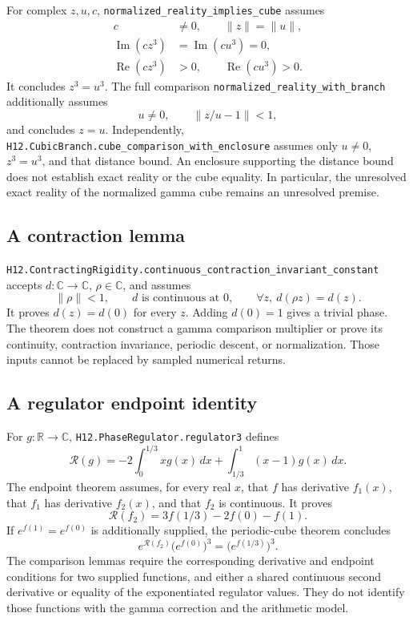 \documentclass[11pt]{article}
\newcommand{\decl}[1]{\nolinkurl{#1}}
\begin{document}
For complex \(z,u,c\), \decl{normalized_reality_implies_cube} assumes
\begin{align*}
 c&\ne0,\qquad \lVert z\rVert=\lVert u\rVert,\\[6pt]
 \operatorname{Im}(cz^3)&=\operatorname{Im}(cu^3)=0,\\[6pt]
 \operatorname{Re}(cz^3)&>0,\qquad\operatorname{Re}(cu^3)>0.
\end{align*}
It concludes \(z^3=u^3\). The full comparison
\decl{normalized_reality_with_branch} additionally assumes
\[
 u\ne0,\qquad \lVert z/u-1\rVert<1,
\]
and concludes \(z=u\). Independently,
\decl{H12.CubicBranch.cube_comparison_with_enclosure} assumes only
\(u\ne0\), \(z^3=u^3\), and that distance bound.
An enclosure supporting the distance bound does not establish exact reality or the cube equality. In particular, the unresolved exact reality of the normalized gamma cube remains an unresolved premise.

\subsection*{A contraction lemma}

\decl{H12.ContractingRigidity.continuous_contraction_invariant_constant}
accepts \(d:\mathbb C\to\mathbb C\), \(\rho\in\mathbb C\), and assumes
\[
 \lVert\rho\rVert<1,\qquad d\text{ is continuous at }0,
 \qquad\forall z,\ d(\rho z)=d(z).
\]
It proves \(d(z)=d(0)\) for every \(z\). Adding \(d(0)=1\) gives a trivial phase.
The theorem does not construct a gamma comparison multiplier or prove its continuity, contraction invariance, periodic descent, or normalization. Those inputs cannot be replaced by sampled numerical returns.

\subsection*{A regulator endpoint identity}

For \(g:\mathbb R\to\mathbb C\), \decl{H12.PhaseRegulator.regulator3} defines
\[
 \mathcal R(g)=-2\int_0^{1/3}xg(x)\,dx
              +\int_{1/3}^{1}(x-1)g(x)\,dx.
\]
The endpoint theorem assumes, for every real \(x\), that \(f\) has derivative \(f_1(x)\), that \(f_1\) has derivative \(f_2(x)\), and that \(f_2\) is continuous. It proves
\[
 \mathcal R(f_2)=3f(1/3)-2f(0)-f(1).
\]
If \(e^{f(1)}=e^{f(0)}\) is additionally supplied, the periodic-cube theorem concludes
\[
 e^{\mathcal R(f_2)}\bigl(e^{f(0)}\bigr)^3
    =\bigl(e^{f(1/3)}\bigr)^3.
\]
The comparison lemmas require the corresponding derivative and endpoint conditions for two supplied functions, and either a shared continuous second derivative or equality of the exponentiated regulator values. They do not identify those functions with the gamma correction and the arithmetic model.
\end{document}
